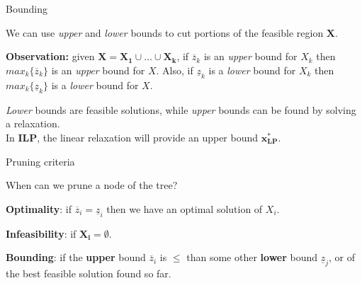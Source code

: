 \documentclass[13pt]{beamer}
\begin{document}
\begin{frame}{Bounding}
    \begin{fullpageitemize}
        \item<1->We can use \textit{upper} and \textit{lower} bounds to cut portions of the feasible region $\mathbf{X}$.
        \item<2->\textbf{Observation:} given $\mathbf{X = X_1 \cup \ldots \cup X_k}$, if $\overline{z}_k$ is an \textit{upper} bound for $X_k$ then $max_k\{\overline{z}_k\}$ is an \textit{upper} bound for $X$. Also, if $\underline{z}_k$ is a \textit{lower} bound for $X_k$ then $max_k{\{\underline{z}_k\}}$ is a \textit{lower} bound for $X$.
        \item<3->\textit{Lower} bounds are feasible solutions, while \textit{upper} bounds can be found by solving a relaxation.\\
        In \textbf{ILP}, the linear relaxation will provide an upper bound $\mathbf{x^*_{LP}}$.
    \end{fullpageitemize}
\end{frame}    

\begin{frame}{Pruning criteria}
    \begin{fullpageitemize}
        \item<1->When can we prune a node of the tree?
        \begin{baseitemize}
            \item<2->[\rtarrow]\textbf{Optimality}: if $\overline{z}_i = \underline{z}_i$ then we have an optimal solution of $X_i$.
            \item<3->[\rtarrow]\textbf{Infeasibility}: if $\mathbf{X_i = \emptyset}$.
            \item<4->[\rtarrow]\textbf{Bounding}: if the \textbf{upper} bound $\overline{z}_i$ is $\mathbf{\leq}$ than some other \textbf{lower} bound $\underline{z}_j$, or of the best feasible solution found so far.
        \end{baseitemize}	
    \end{fullpageitemize}
\end{frame}    
\end{document}
